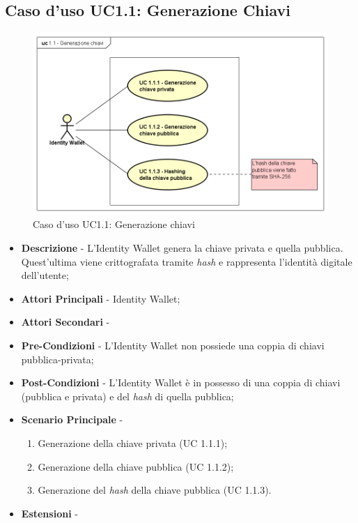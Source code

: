 \subsection{Caso d'uso UC1.1: Generazione Chiavi}
\begin{figure}[h]
	\centering
	\includegraphics[scale=0.50]{immagini/usecase/UC11_GenerazioneChiavi}
	\caption{Caso d'uso UC1.1: Generazione chiavi}
\end{figure}
\begin{itemize}
	\item \textbf{Descrizione} - L'Identity Wallet genera la chiave privata e quella pubblica. Quest'ultima viene crittografata tramite \textit{hash} e rappresenta l'identità digitale dell'utente;
	\item \textbf{Attori Principali} - Identity Wallet;
	\item \textbf{Attori Secondari} -
	\item \textbf{Pre-Condizioni} - L'Identity Wallet non possiede una coppia di chiavi pubblica-privata;
	\item \textbf{Post-Condizioni} - L'Identity Wallet è in possesso di una coppia di chiavi (pubblica e privata) e del \textit{hash} di quella pubblica;
	\item \textbf{Scenario Principale} -
	\begin{enumerate}
		\item Generazione della chiave privata (UC 1.1.1);
		\item Generazione della chiave pubblica (UC 1.1.2);
		\item Generazione del \textit{hash} della chiave pubblica (UC 1.1.3).
	\end{enumerate}
	\item \textbf{Estensioni} -
\end{itemize}
\newpage
